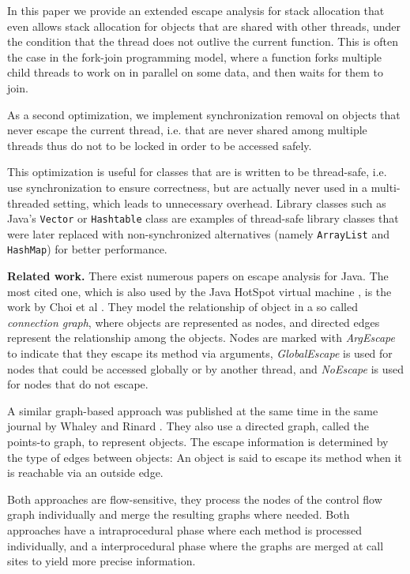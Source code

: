 \documentclass[letterpaper]{article}
\newcommand{\mypar}[1]{{\bf #1.}}
\begin{document}
In this paper we provide an extended escape analysis for stack allocation that
even allows stack allocation for objects that are shared with other threads,
under the condition that the thread does not outlive the current function.
This is often the case in the fork-join programming model, where a function
forks multiple child threads to work on in parallel on some data, and then
waits for them to join.

As a second optimization, we implement synchronization removal on objects that
never escape the current thread, i.e. that are never shared among multiple threads
thus do not to be locked in order to be accessed safely. 

This optimization is useful for classes that are is written to be thread-safe,
i.e. use synchronization to ensure correctness, but are actually never used
in a multi-threaded setting, which leads to unnecessary overhead. Library
classes such as Java's \texttt{Vector} or \texttt{Hashtable} class are examples
of thread-safe library classes that were later replaced with non-synchronized
alternatives (namely \texttt{ArrayList} and \texttt{HashMap}) for better
performance.

\mypar{Related work}
There exist numerous papers on escape analysis for Java. The most cited one,
which is also used by the Java HotSpot virtual machine \cite{HotSpot}, is the work by
Choi et al \cite{Choi:99}. They model the relationship of object in a so called
\emph{connection graph}, where objects are represented as nodes, and directed
edges represent the relationship among the objects. Nodes are marked with \emph{ArgEscape}
to indicate that they escape its method via arguments, \emph{GlobalEscape} is used
for nodes that could be accessed globally or by another thread, and \emph{NoEscape}
is used for nodes that do not escape.

A similar graph-based approach was published at the same time in the same journal
by Whaley and Rinard \cite{Whaley:99}. They also use a directed graph, called the points-to graph,
to represent objects. The escape information is determined by the type of edges
between objects: An object is said to escape its method when it is reachable via an outside edge.

Both approaches are flow-sensitive, they process the nodes of the control flow graph
individually and merge the resulting graphs where needed. Both approaches have a
intraprocedural phase where each method is processed individually, and a interprocedural
phase where the graphs are merged at call sites to yield more precise information.
\end{document}
